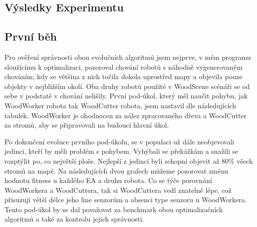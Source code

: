 \subsection{Výsledky Experimentu}
\subsection{První běh}
Pro ověření správnosti obou evolučních algoritmů jsem nejprve, v mém programu sloužícímu k optimalizaci, pozoroval chování robotů s náhodně vygenerovaným chováním, kdy se většina z nich točila dokola uprostřed mapy a objevila pouze objekty v nejbližším okolí. Oba druhy robotů použité v WoodScene scénáři se od sebe v podstatě v chování nelišily. První pod-úkol, který měl naučit pohybu, jak WoodWorker robota tak WoodCutter robota, jsem nastavil dle následujících tabulek. WoodWorker je ohodnocen za nález zpracovaného dřeva a WoodCutter za stromů, aby se připravovali na budoucí hlavní úkol.\par
{} \par
{} \par
\par
Po dokončení evoluce prvního pod-úkolu, se v populaci už dále neobjevovali jedinci, kteří by měli problém s pohybem. Vyhýbali se překážkám a snažili se rozptýlit po, co největší ploše. Nejlepší z jedincí byli schopni objevit až 80\% všech stromů na mapě. Na následujících dvou grafech můžeme pozorovat změnu hodnotu fitness u každého EA a druhu robota. Co se týče porovnání WoodWorkera a WoodCuttera, tak si WoodCuttera vedl znatelně lépe, což přisuzuji větší délce jeho line senzorům a absenci type senzoru u WoodWorkera. Tento pod-úkol by se dal považovat za benchmark obou optimalizačních algoritmů a také za kontrolu jejich správnosti. 

